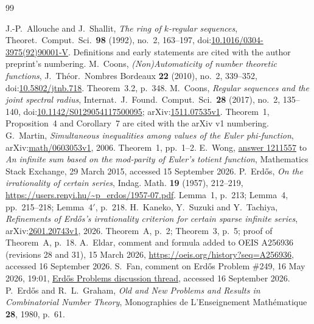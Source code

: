 \clearpage
\begin{thebibliography}{99}
\small
\raggedright
\setlength{\itemsep}{0pt}
J.-P.~Allouche and J.~Shallit, \emph{The ring of $k$-regular sequences},
Theoret.\ Comput.\ Sci.\ \textbf{98} (1992), no.~2, 163--197,
doi:\href{https://doi.org/10.1016/0304-3975(92)90001-V}{10.1016/0304-3975(92)90001-V}.
Definitions and early statements are cited with the author preprint's numbering.
M.~Coons, \emph{(Non)Automaticity of number theoretic functions},
J.\ Th\'eor.\ Nombres Bordeaux \textbf{22} (2010), no.~2, 339--352,
doi:\href{https://doi.org/10.5802/jtnb.718}{10.5802/jtnb.718}.
Theorem~3.2, p.~348.
M.~Coons, \emph{Regular sequences and the joint spectral radius},
Internat.\ J.\ Found.\ Comput.\ Sci.\ \textbf{28} (2017), no.~2, 135--140,
doi:\href{https://doi.org/10.1142/S0129054117500095}{10.1142/S0129054117500095};
arXiv:\href{https://arxiv.org/abs/1511.07535v1}{1511.07535v1}.
Theorem~1, Proposition~4 and Corollary~7 are cited with the arXiv v1 numbering.
G.~Martin, \emph{Simultaneous inequalities among values of the Euler
phi-function}, arXiv:\href{https://arxiv.org/abs/math/0603053v1}{math/0603053v1}, 2006.
Theorem~1, pp.~1--2.
E.~Wong, \href{https://math.stackexchange.com/a/1211557}{answer 1211557} to
\emph{An infinite sum based on the mod-parity of Euler's totient function},
Mathematics Stack Exchange, 29 March 2015, accessed 15 September 2026.
P.~Erd\H{o}s, \emph{On the irrationality of certain series}, Indag. Math.
\textbf{19} (1957), 212--219,
\url{https://users.renyi.hu/~p_erdos/1957-07.pdf}.
Lemma~1, p.~213; Lemma~4, pp.~215--218; Lemma~4$'$, p.~218.
H.~Kaneko, Y.~Suzuki and Y.~Tachiya, \emph{Refinements of Erd\H{o}s's
irrationality criterion for certain sparse infinite series},
arXiv:\href{https://arxiv.org/abs/2601.20743v1}{2601.20743v1}, 2026.
Theorem~A, p.~2; Theorem~3, p.~5; proof of Theorem~A, p.~18.
A.~Eldar, comment and formula added to OEIS A256936 (revisions 28 and 31),
15 March 2026, \url{https://oeis.org/history?seq=A256936},
accessed 16 September 2026.
S.~Fan, comment on Erd\H{o}s Problem \#249, 16 May 2026, 19:01,
\href{https://www.erdosproblems.com/forum/thread/249}{Erd\H{o}s Problems
discussion thread}, accessed 16 September 2026.
P.~Erd\H{o}s and R.~L.~Graham, \emph{Old and New Problems and Results in
Combinatorial Number Theory}, Monographies de L'Enseignement
Math\'ematique \textbf{28}, 1980, p.~61.

\end{thebibliography}
